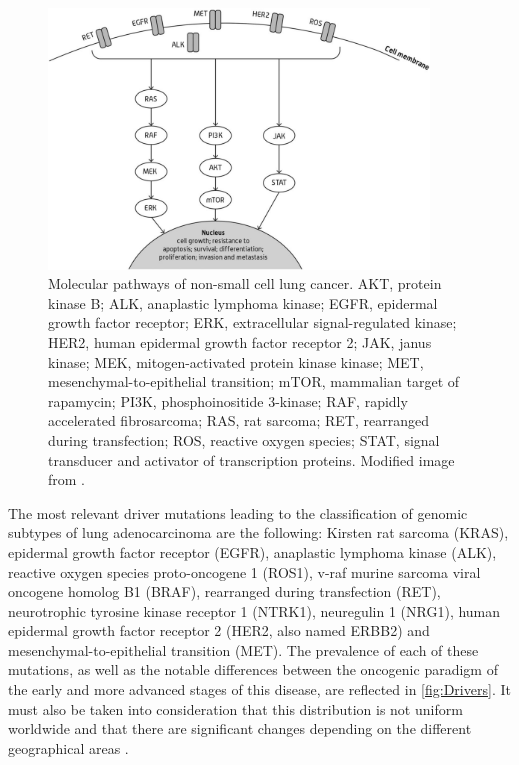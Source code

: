 \begin{figure}[t]
    \centering
    \includegraphics[width=0.9\textwidth]{Images/chapter_1/molecular_pathway.png}
    \caption{Molecular pathways of non-small cell lung cancer. AKT, protein kinase B; ALK, anaplastic lymphoma kinase; EGFR, epidermal growth factor receptor; ERK, extracellular signal-regulated kinase; HER2, human epidermal growth factor receptor 2; JAK, janus kinase; MEK, mitogen-activated protein kinase kinase; MET, mesenchymal-to-epithelial transition; mTOR, mammalian target of rapamycin; PI3K, phosphoinositide 3-kinase; RAF, rapidly accelerated fibrosarcoma; RAS, rat sarcoma; RET, rearranged during transfection; ROS, reactive oxygen species; STAT, signal transducer and activator of transcription proteins. Modified image from \cite{NSCLC_drivers}.}
    \label{fig:Pathway}
\end{figure}

The most relevant driver mutations leading to the classification of genomic subtypes of lung adenocarcinoma are the following: Kirsten rat sarcoma (KRAS), epidermal growth factor receptor (EGFR), anaplastic lymphoma kinase (ALK), reactive oxygen species proto-oncogene 1 (ROS1), v-raf murine sarcoma viral oncogene homolog B1 (BRAF), rearranged during transfection (RET), neurotrophic tyrosine kinase receptor 1 (NTRK1), neuregulin 1 (NRG1), human epidermal growth factor receptor 2 (HER2, also named ERBB2) and mesenchymal-to-epithelial transition (MET). The prevalence of each of these mutations, as well as the notable differences between the oncogenic paradigm of the early and more advanced stages of this disease, are reflected in \autoref{fig:Drivers}. It must also be taken into consideration that this distribution is not uniform worldwide and that there are significant changes depending on the different geographical areas \cite{Mol_bio}.

